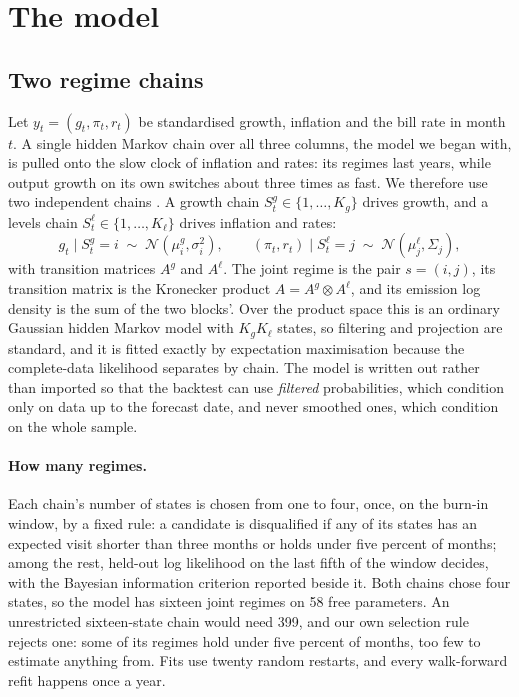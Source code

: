 \documentclass[11pt]{article}
\begin{document}
\section{The model}\label{sec:model}

\subsection{Two regime chains}

Let $y_t = (g_t, \pi_t, r_t)$ be standardised growth, inflation and the bill rate in month $t$. A single
hidden Markov chain over all three columns, the model we began with, is pulled onto the slow clock of
inflation and rates: its regimes last years, while output growth on its own switches about three times
as fast. We therefore use two independent chains \citep{ghahramani1997factorial}. A growth chain
$S^{g}_t \in \{1,\dots,K_g\}$ drives growth, and a levels chain $S^{\ell}_t \in \{1,\dots,K_\ell\}$ drives
inflation and rates:
\begin{equation}
  g_t \mid S^{g}_t = i \;\sim\; \mathcal{N}(\mu^{g}_i, \sigma^{2}_i), \qquad
  (\pi_t, r_t) \mid S^{\ell}_t = j \;\sim\; \mathcal{N}(\mu^{\ell}_j, \Sigma_j),
\end{equation}
with transition matrices $A^{g}$ and $A^{\ell}$. The joint regime is the pair $s = (i, j)$, its transition
matrix is the Kronecker product $A = A^{g} \otimes A^{\ell}$, and its emission log density is the sum of
the two blocks'. Over the product space this is an ordinary Gaussian hidden Markov model with
$K_g K_\ell$ states, so filtering and projection are standard, and it is fitted exactly by expectation
maximisation because the complete-data likelihood separates by chain. The model is written out rather
than imported so that the backtest can use \emph{filtered} probabilities, which condition only on data
up to the forecast date, and never smoothed ones, which condition on the whole sample.

\paragraph{How many regimes.} Each chain's number of states is chosen from one to four, once, on the
burn-in window, by a fixed rule: a candidate is disqualified if any of its states has an expected visit
shorter than three months or holds under five percent of months; among the rest, held-out log likelihood on the
last fifth of the window decides, with the Bayesian information criterion \citep{schwarz1978estimating}
reported beside it. Both chains chose four states, so the model has sixteen joint regimes on 58 free
parameters. An unrestricted sixteen-state chain would need 399, and our own selection rule rejects one:
some of its regimes hold under five percent of months, too few to estimate anything from. Fits use twenty
random restarts, and every walk-forward refit happens once a year.
\end{document}
